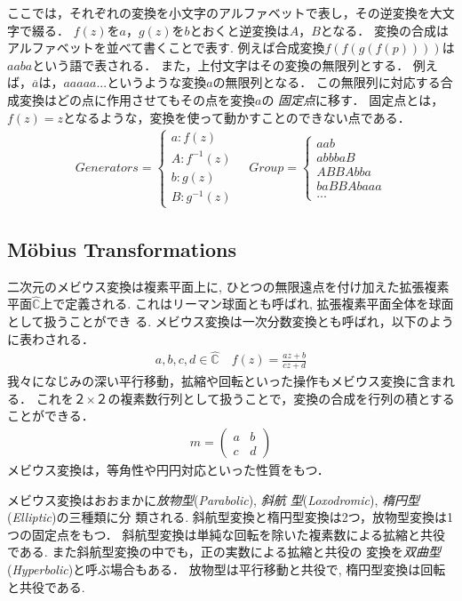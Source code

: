 ここでは，それぞれの変換を小文字のアルファベットで表し，その逆変換を大文字で綴る．
$f(z)$を$a$，$g(z)$を$b$とおくと逆変換は$A$，$B$となる．
変換の合成はアルファベットを並べて書くことで表す.
例えば合成変換$f(f(g(f(p))))$は$aaba$という語で表される．
また，上付文字はその変換の無限列とする．
例えば，$\overline{a}$は，$aaaaa...$というような変換$a$の無限列となる．
この無限列に対応する合成変換はどの点に作用させてもその点を変換$a$の
\emph{固定点}に移す．
固定点とは，$f(z) = z$となるような，変換を使って動かすことのできない点である．
 \begin{align*}
  Generators =
   \begin{cases}
    a \colon f(z) \\
    A \colon f^{-1}(z) \\
    b \colon g(z) \\
    B \colon g^{-1}(z)
   \end{cases}
  \quad
  Group =
   \begin{cases}
    aab\\
    abbbaB \\
    ABBAbba \\
    baBBAbaaa \\
    ...
   \end{cases}
 \end{align*}

\subsection{M\"obius Transformations}

二次元のメビウス変換は複素平面上に, ひとつの無限遠点を付け加えた拡張複素
平面$\hat{\mathbb{C}}$上で定義される.
これはリーマン球面とも呼ばれ, 拡張複素平面全体を球面として扱うことができ
る.
メビウス変換は一次分数変換とも呼ばれ，以下のように表わされる．
\begin{align*}
 a, b, c, d\in \hat{\mathbb{C}} \quad f(z) = \frac{az + b}{cz + d}
\end{align*}
我々になじみの深い平行移動，拡縮や回転といった操作もメビウス変換に含まれる．
これを２×２の複素数行列として扱うことで，変換の合成を行列の積とすることができる．
\begin{align*}
  m = \left(
 \begin{array}{ccc}
  a & b \\
  c & d
 \end{array}
 \right)
\end{align*}
メビウス変換は，等角性や円円対応といった性質をもつ．

メビウス変換はおおまかに\emph{放物型}(\textit{Parabolic}), \emph{斜航
型}(\textit{Loxodromic}), \emph{楕円型}(\textit{Elliptic})の三種類に分
類される.
斜航型変換と楕円型変換は2つ，放物型変換は1つの固定点をもつ．
斜航型変換は単純な回転を除いた複素数による拡縮と共役である.
また斜航型変換の中でも，正の実数による拡縮と共役の
変換を\emph{双曲型}(\textit{Hyperbolic})と呼ぶ場合もある．
放物型は平行移動と共役で, 楕円型変換は回転と共役である.

